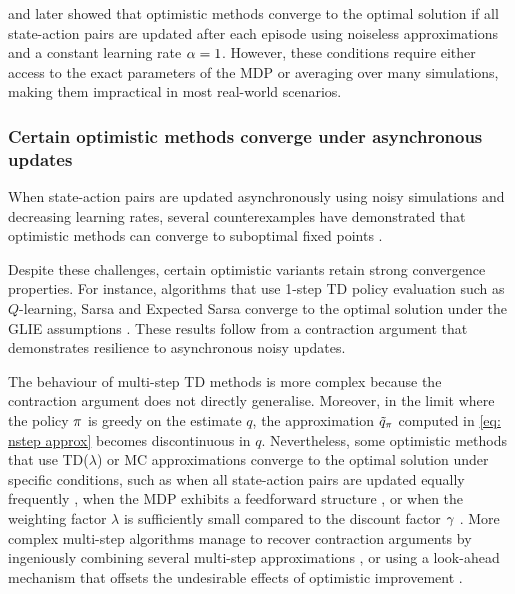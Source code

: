 
\cite{Rothblum1979IteratedProcesses} and later \cite{Canbolat2013ApproximateProcesses} showed that optimistic methods converge to the optimal solution if all state-action pairs are updated after each episode using noiseless approximations and a constant learning rate $\alpha=1$.
However, these conditions require either access to the exact parameters of the MDP or averaging over many simulations, making them impractical in most real-world scenarios.


\subsubsection{Certain optimistic methods converge under asynchronous updates}

When state-action pairs are updated asynchronously using noisy simulations and decreasing learning rates, several counterexamples have demonstrated that optimistic methods can converge to suboptimal fixed points \citep{Williams1993AnalysisSystems, Bertsekas2010Williams-BairdIteration, Bertsekas1996Neuro-DynamicProgramming, Wang2022OnLearning}.


Despite these challenges, certain optimistic variants retain strong convergence properties.
For instance, algorithms that use 1-step TD policy evaluation such as $Q$-learning, Sarsa and Expected Sarsa converge to the optimal solution under the GLIE assumptions \citep{Watkins1992Q-learning, Jaakkola1993ConvergenceAlgorithms, Singh2000ConvergenceAlgorithms, vanSeijen2009ASarsa}.
These results follow from a contraction argument that demonstrates resilience to asynchronous noisy updates.


The behaviour of multi-step TD methods is more complex because the contraction argument does not directly generalise. Moreover, in the limit where the policy $\pi$ is greedy on the estimate $q$, the approximation $\Tilde{q}_{\pi}$ computed in \eqref{eq: nstep approx} becomes discontinuous in $q$.
Nevertheless, some optimistic methods that use TD($\lambda$) or MC approximations
converge to the optimal solution under specific conditions,
such as when all state-action pairs are updated equally frequently \citep{Tsitsiklis2002OnIteration, Liu2021OnStarts, Chen2018OnProblem},
when the MDP exhibits a feedforward structure \citep{Wang2022OnLearning, Lubars2021OptimisticStructure},
or when the weighting factor $\lambda$ is sufficiently small compared to the discount factor $\gamma$ \citep{Harutyunyan2016QCorrections}.
More complex multi-step algorithms manage to recover contraction arguments 
by ingeniously combining several multi-step approximations \citep{Munos2016SafeLearning},
or using a look-ahead mechanism that offsets the undesirable effects of optimistic improvement \citep{Winnicki2023OnEvaluation}.


